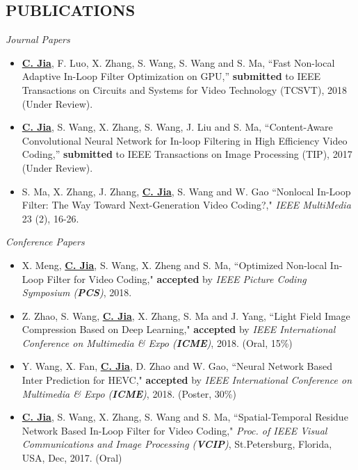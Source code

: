 \documentclass[margin, 10pt]{res} %
\begin{document}
\begin{resume}

\section{PUBLICATIONS}
{\sl Journal Papers}
\begin{itemize}
\item{\underline{\bf C. Jia}, F. Luo, X. Zhang, S. Wang, S. Wang and S. Ma, ``Fast Non-local Adaptive In-Loop Filter Optimization on GPU,” {\bf submitted} to IEEE Transactions on Circuits and Systems for Video Technology (TCSVT), 2018 (Under Review).}
\item{\underline{\bf C. Jia}, S. Wang, X. Zhang, S. Wang, J. Liu and S. Ma, ``Content-Aware Convolutional Neural Network for In-loop Filtering in High Efficiency Video Coding,” {\bf submitted} to IEEE Transactions on Image Processing (TIP), 2017 (Under Review).}
\item{S. Ma, X. Zhang, J. Zhang, \underline{\bf C. Jia}, S. Wang and W. Gao ``Nonlocal In-Loop Filter: The Way Toward Next-Generation Video Coding?," {\em {IEEE} MultiMedia} 23 (2), 16-26.}
\end{itemize}

{\sl Conference Papers}
\begin{itemize}
\item{X. Meng, \underline{\bf C. Jia}, S. Wang, X. Zheng and S. Ma, ``Optimized Non-local In-Loop Filter for Video Coding," {\bf accepted} by {\em IEEE Picture Coding Symposium ({\bf PCS})}, 2018. }

\item{Z. Zhao, S. Wang, \underline{\bf C. Jia}, X. Zhang, S. Ma and J. Yang, ``Light Field Image Compression Based on Deep Learning," {\bf accepted} by {\em IEEE International Conference on Multimedia \& Expo ({\bf ICME})}, 2018. (Oral, 15\%)}

\item{Y. Wang, X. Fan, \underline{\bf C. Jia}, D. Zhao and W. Gao, ``Neural Network Based Inter Prediction for HEVC," {\bf accepted} by {\em IEEE International Conference on Multimedia \& Expo ({\bf ICME})}, 2018. (Poster, 30\%)}

\item{\underline{\bf C. Jia}, S. Wang, X. Zhang, S. Wang and S. Ma, ``Spatial-Temporal Residue Network Based In-Loop Filter for Video Coding," {\em Proc. of IEEE Visual Communications and Image Processing ({\bf VCIP})}, St.Petersburg, Florida, USA, Dec, 2017. (Oral)}


\end{itemize}
\end{resume}
\end{document}
